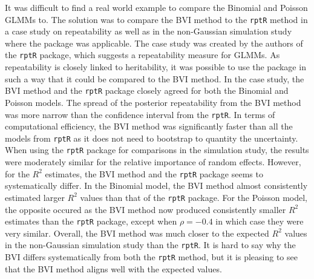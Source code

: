 It was difficult to find a real world example to compare the Binomial and Poisson GLMMs to. The solution was to compare the BVI method to the \texttt{rptR} method in a case study on repeatability as well as in the non-Gaussian simulation study where the package was applicable. The case study was created by the authors of the \texttt{rptR} package, which suggests a repeatability measure for GLMMs. As repeatability is closely linked to heritability, it was possible to use the package in such a way that it could be compared to the BVI method. In the case study, the BVI method and the \texttt{rptR} package closely agreed for both the Binomial and Poisson models. The spread of the posterior repeatability from the BVI method was more narrow than the confidence interval from the \texttt{rptR}. In terms of computational efficiency, the BVI method was significantly faster than all the models from \texttt{rptR} as it does not need to bootstrap to quantity the uncertainty. When using the \texttt{rptR} package for comparisons in the simulation study, the results were moderately similar for the relative importance of random effects. However, for the $R^2$ estimates, the BVI method and the \texttt{rptR} package seems to systematically differ. In the Binomial model, the BVI method almost consistently estimated larger $R^2$ values than that of the \texttt{rptR} package. For the Poisson model, the opposite occured as the BVI method now produced consistently smaller $R^2$ estimates than the \texttt{rptR} package, except when $\rho=-0.4$ in which case they were very similar. Overall, the BVI method was much closer to the expected $R^2$ values in the non-Gaussian simulation study than the \texttt{rptR}. It is hard to say why the BVI differs systematically from both the \texttt{rptR} method, but it is pleasing to see that the BVI method aligns well with the expected values.
\\
\\
